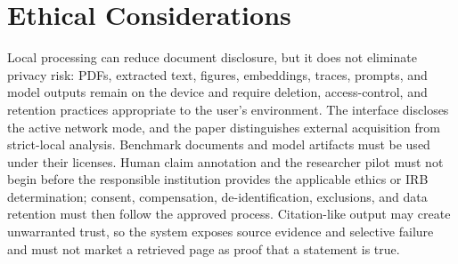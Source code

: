 \section*{Ethical Considerations}
Local processing can reduce document disclosure, but it does not eliminate privacy risk: PDFs, extracted text, figures, embeddings, traces, prompts, and model outputs remain on the device and require deletion, access-control, and retention practices appropriate to the user's environment. The interface discloses the active network mode, and the paper distinguishes external acquisition from strict-local analysis. Benchmark documents and model artifacts must be used under their licenses. Human claim annotation and the researcher pilot must not begin before the responsible institution provides the applicable ethics or IRB determination; consent, compensation, de-identification, exclusions, and data retention must then follow the approved process. Citation-like output may create unwarranted trust, so the system exposes source evidence and selective failure and must not market a retrieved page as proof that a statement is true.
